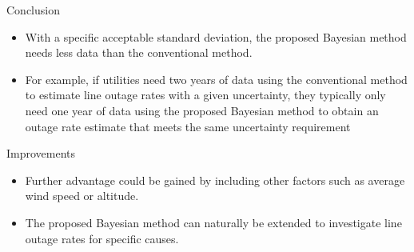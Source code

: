 \documentclass{beamer}
\begin{document}
\begin{frame}{Conclusion}
\begin{block}{}
\begin{itemize}


\item With a specific acceptable
standard deviation, the proposed Bayesian method needs less
data than the conventional method.
\item For example, if utilities need two years of data
using the conventional method to estimate line outage rates with
a given uncertainty, they typically only need one year of data
using the proposed Bayesian method to obtain an outage rate
estimate that meets the same uncertainty requirement
\end{itemize}
\end{block}
\end{frame}

\begin{frame}{Improvements}
\begin{block}{}
\begin{itemize}


\item Further advantage could be gained by including other factors
such as average wind speed or altitude.
\item The proposed
Bayesian method can naturally be extended to investigate line
outage rates for specific causes.
\end{itemize}
\end{block}
\end{frame}
\end{document}
